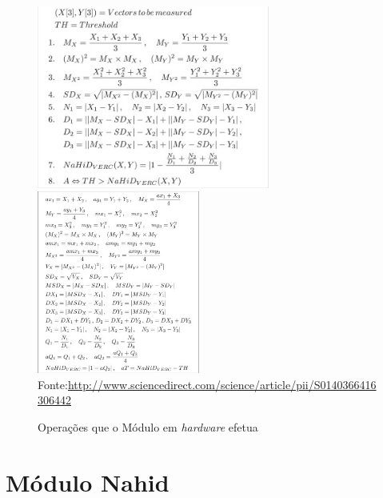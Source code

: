 
\begin{figure}[tb]
	\begin{center}
		\centering
			\caption{Operações que o Módulo em \textit{hardware} efetua}
		\includegraphics[height=6cm]{figures/Op1.jpg} \quad
		\includegraphics[height=6cm]{figures/Op2.jpg}
		\\{Fonte:\url{http://www.sciencedirect.com/science/article/pii/S0140366416306442}}
		\label{formulas}
	\end{center}
\end{figure}

\section{Módulo Nahid}\label{Sub:equa}

